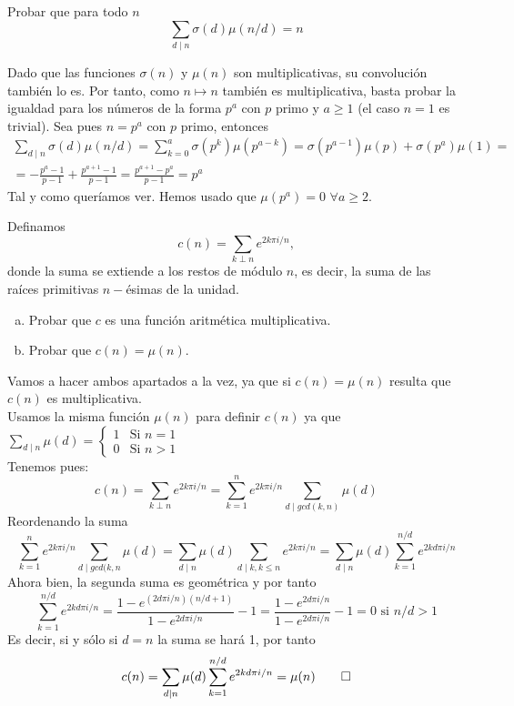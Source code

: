 \documentclass[twoside]{article}
\begin{document}
\begin{ejercicio}{3}
Probar que para todo $n$
\[
\sum_{d\mid n} \sigma(d)\mu(n/d)=n 
\]
\begin{sol}
Dado que las funciones $\sigma(n)$ y $\mu(n)$ son multiplicativas, su convolución también lo es. Por tanto, como $n\mapsto n$ también es multiplicativa, basta probar la igualdad para los números de la forma $p^a$ con $p$ primo y $a\geq 1$ (el caso $n=1$ es trivial). Sea pues $n=p^a$ con $p$ primo, entonces
\begin{gather*}
\sum_{d\mid n} \sigma(d)\mu(n/d) = \sum_{k=0}^a \sigma(p^k)\mu(p^{a-k}) = \sigma(p^{a-1})\mu(p) + \sigma(p^a)\mu(1) = \\
=  -\frac{p^a - 1}{p-1} +\frac{p^{a+1}-1}{p-1} = \frac{p^{a+1}-p^a}{p-1} = p^a
\end{gather*}
Tal y como queríamos ver. Hemos usado que $\mu(p^a)=0$ $\forall a \geq 2$.
\end{sol}
\end{ejercicio}
\newpage
\begin{ejercicio}{4}
Definamos $$c(n)=\sum\limits_{k\perp n} e^{2k\pi i/n},$$ donde la suma se extiende a los restos de módulo $n$, es decir, la suma de las raíces primitivas $n-$ésimas de la unidad.

\begin{enumerate}[a)]
\item Probar que $c$ es una función aritmética multiplicativa.
\item Probar que $c(n)=\mu (n)$.
\end{enumerate}

\begin{sol}
Vamos a hacer ambos apartados a la vez, ya que si $c(n)=\mu(n)$ resulta que $c(n)$ es multiplicativa.\\
Usamos la misma función $\mu(n)$ para definir $c(n)$ ya que $\sum\limits_{d\mid n}\mu(d)=\left\lbrace\begin{array}{ll}
1 & \text{Si } n=1\\
0 & \text{Si } n>1
\end{array}\right.$\\ Tenemos pues:$$c(n)=\sum\limits_{k\perp n} e^{2k\pi i/n}=\sum\limits_{k=1}^n e^{2k\pi i/n}\sum\limits_{d\mid gcd(k,n)}\mu(d)$$ Reordenando la suma $$\sum\limits_{k=1}^n e^{2k\pi i/n}\sum\limits_{d\mid gcd(k,n}\mu(d)=\sum\limits_{d\mid n} \mu(d)\sum\limits_{d\mid k,k\leq n}e^{2k\pi i/n}=\sum\limits_{d\mid n} \mu(d)\sum\limits_{k=1}^{n/d}e^{2kd\pi i/n}$$ Ahora bien, la segunda suma es geométrica y por tanto $$\sum\limits_{k=1}^{n/d}e^{2kd\pi i/n}=\frac{1-e^{(2d\pi i/n)(n/d+1)}}{1-e^{2d\pi i/n}}-1=\frac{1-e^{2d\pi i/n}}{1-e^{2d\pi i/n}}-1=0\text{ si }n/d>1$$ Es decir, si y sólo si $d=n$ la suma se hará 1, por tanto $$c(n)=\sum\limits_{d\mid n} \mu(d)\sum\limits_{k=1}^{n/d}e^{2kd\pi i/n}=\mu(n)\qed$$
\end{sol}
\end{ejercicio}
\newpage
\end{document}
